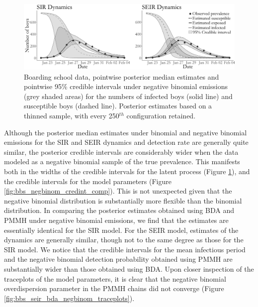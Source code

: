 \begin{figure}[htbp]
	\centering
	\includegraphics[width=\linewidth]{figures/bbs_latent_post_negbinom.pdf}
	\caption{Boarding school data, pointwise posterior median estimates and pointwise 95\% credible intervals under negative binomial emissions (grey shaded areas) for the numbers of infected boys (solid line) and susceptible boys (dashed line). Posterior estimates based on a thinned sample, with every 250$ ^{th} $ configuration retained.}
	\label{fig:bbs_dat_negbinom}
\end{figure}

Although the posterior median estimates under binomial and negative binomial emissions for the SIR and SEIR dynamics and detection rate are generally quite similar, the posterior credible intervals are considerably wider when the data modeled as a negative binomial sample of the true prevalence. This manifests both in the widths of the credible intervals for the latent process (Figure \ref{fig:bbs_dat_negbinom}), and the credible intervals for the model parameters (Figure \ref{fig:bbs_negbinom_credint_comp}). This is not unexpected given that the negative binomial distribution is substantially more flexible than the binomial distribution. In comparing the posterior estimates obtained using BDA and PMMH under negative binomial emissions, we find that the estimates are essentially identical for the SIR model. For the SEIR model, estimates of the dynamics are generally similar, though not to the same degree as those for the SIR model. We notice that the credible intervals for the mean infectious period and the negative binomial detection probability obtained using PMMH are substantially wider than those obtained using BDA. Upon closer inspection of the traceplots of the model parameters, it is clear that the negative binomial overdispersion parameter in the PMMH chains did not converge (Figure \ref{fig:bbs_seir_bda_negbinom_traceplots}).

